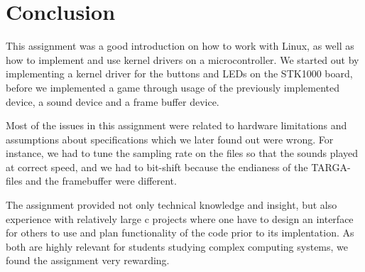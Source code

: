 \section{Conclusion}

This assignment was a good introduction on how to work with Linux, as
well as how to implement and use kernel drivers on a microcontroller. We
started out by implementing a kernel driver for the buttons and LEDs on
the STK1000 board, before we implemented a game through usage of the
previously implemented device, a sound device and a frame buffer
device.

Most of the issues in this assignment were related to hardware
limitations and assumptions about specifications which we later found
out were wrong. For instance, we had to tune the sampling rate on the
files so that the sounds played at correct speed, and we had to
bit-shift because the endianess of the TARGA-files and the framebuffer
were different.

The assignment provided not only technical knowledge and insight, but
also experience with relatively large c projects where one have to
design an interface for others to use and plan functionality of the code
prior to its implentation. As both are highly relevant for students
studying complex computing systems, we found the assignment very
rewarding.

